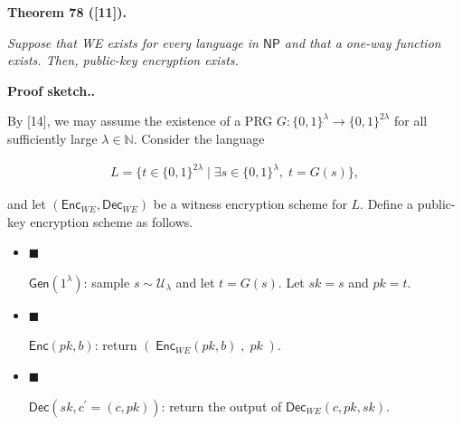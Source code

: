 \documentclass[10pt,a4paper]{article}
\begin{document}




\par\medskip\noindent\textbf{
\textbf{Theorem 78}\textbf{ }([11])\textbf{.}
}\par



\emph{Suppose that WE exists for every language in ${\mathsf{NP}}$ and that a one-way function exists. Then, public-key encryption exists.}\par






\par\medskip\noindent\textbf{Proof sketch..}\par




By [14], we may assume the existence of a PRG $G:\{0,1\}^{\lambda}\to\{0,1\}^{2\lambda}$ for all sufficiently large $\lambda\in\mathbb{N}$. Consider the language\par


\[\begin{gathered}
L=\{t\in\{0,1\}^{2\lambda}\mid\exists s\in\{0,1\}^{\lambda},\;t=G(s)\},
\end{gathered}\]


and let $({\mathsf{Enc}}_{WE},{\mathsf{Dec}}_{WE})$ be a witness encryption scheme for $L$. Define a public-key encryption scheme as follows.\par


\begin{itemize}


\item[] 
$\blacksquare$ 


${\mathsf{Gen}}(1^{\lambda})$: sample $s\sim\mathcal{U}_{\lambda}$ and let $t=G(s)$. Let $sk=s$ and $pk=t$.\par





\item[] 
$\blacksquare$ 


${\mathsf{Enc}}(pk,b)$: return $(\;{\mathsf{Enc}}_{WE}(pk,b)\;,\;pk\;)$.\par





\item[] 
$\blacksquare$ 


${\mathsf{Dec}}(sk,c^{\prime}=(c,pk))$: return the output of ${\mathsf{Dec}}_{WE}(c,pk,sk)$.\par





\end{itemize}
\end{document}
